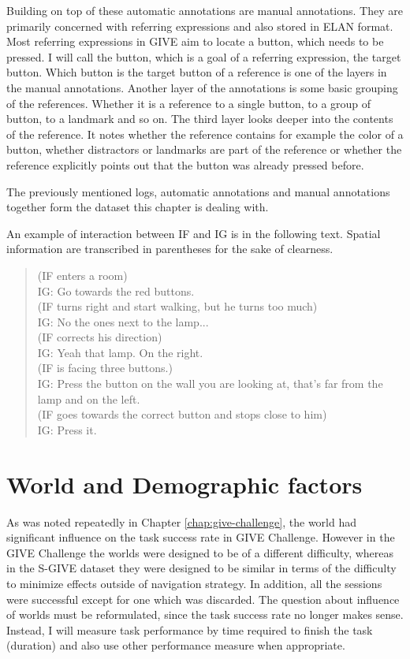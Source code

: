 Building on top of these automatic annotations are manual annotations. They are primarily concerned with referring expressions and also stored in ELAN format. Most referring expressions in GIVE aim to locate a button, which needs to be pressed. I will call the button, which is a goal of a referring expression, the target button. Which button is the target button of a reference is one of the layers in the manual annotations. Another layer of the annotations is some basic grouping of the references. Whether it is a reference to a single button, to a group of button, to a landmark and so on. The third layer looks deeper into the contents of the reference. It notes whether the reference contains for example the color of a button, whether distractors or landmarks are part of the reference or whether the reference explicitly points out that the button was already pressed before.

The previously mentioned logs, automatic annotations and manual annotations together form the dataset this chapter is dealing with.

An example of interaction between IF and IG is in the following text. Spatial information are transcribed in parentheses for the sake of clearness.

\begin{verse}
(IF enters a room)\\
IG: Go towards the red buttons.\\
(IF turns right and start walking, but he turns too much)\\
IG: No the ones next to the lamp...\\
(IF corrects his direction)\\
IG: Yeah that lamp. On the right.\\
(IF is facing three buttons.)\\
IG: Press the button on the wall you are looking at, that's far from the lamp and on the left. \\
(IF goes towards the correct button and stops close to him)\\
IG: Press it.\\
\end{verse}

\section{World and Demographic factors}
\label{sec:world-demo-factors}
As was noted repeatedly in Chapter \ref{chap:give-challenge}, the world had significant influence on the task success rate in GIVE Challenge. However in the GIVE Challenge the worlds were designed to be of a different difficulty, whereas in the S-GIVE dataset they were designed to be similar in terms of the difficulty to minimize effects outside of navigation strategy. In addition, all the sessions were successful except for one which was discarded. The question about influence of worlds must be reformulated, since the task success rate no longer makes sense. Instead, I will measure task performance by time required to finish the task (duration) and also use other performance measure when appropriate.

